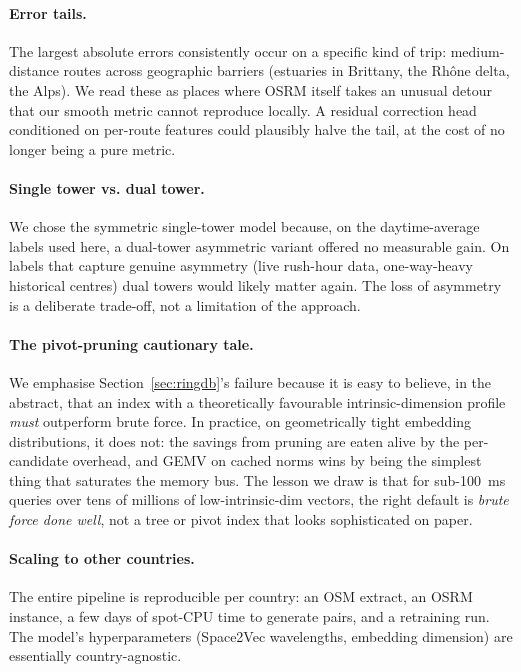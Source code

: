 \documentclass[11pt,a4paper]{article}
\begin{document}
\paragraph{Error tails.}
The largest absolute errors consistently occur on a specific kind of
trip: medium-distance routes across geographic barriers (estuaries
in Brittany, the Rh\^one delta, the Alps). We read these as places
where OSRM itself takes an unusual detour that our smooth metric
cannot reproduce locally. A residual correction head conditioned on
per-route features could plausibly halve the tail, at the cost of
no longer being a pure metric.

\paragraph{Single tower vs. dual tower.}
We chose the symmetric single-tower model because, on the
daytime-average labels used here, a dual-tower asymmetric variant
offered no measurable gain. On labels that capture genuine asymmetry
(live rush-hour data, one-way-heavy historical centres) dual towers
would likely matter again. The loss of asymmetry is a deliberate
trade-off, not a limitation of the approach.

\paragraph{The pivot-pruning cautionary tale.}
We emphasise Section~\ref{sec:ringdb}'s failure because it is easy
to believe, in the abstract, that an index with a theoretically
favourable intrinsic-dimension profile \emph{must} outperform brute
force. In practice, on geometrically tight embedding distributions,
it does not: the savings from pruning are eaten alive by the
per-candidate overhead, and GEMV on cached norms wins by being the
simplest thing that saturates the memory bus. The lesson we draw is
that for sub-100~ms queries over tens of millions of
low-intrinsic-dim vectors, the right default is \emph{brute force
done well}, not a tree or pivot index that looks sophisticated on
paper.

\paragraph{Scaling to other countries.}
The entire pipeline is reproducible per country: an OSM extract, an
OSRM instance, a few days of spot-CPU time to generate pairs, and a
retraining run. The model's hyperparameters (Space2Vec wavelengths,
embedding dimension) are essentially country-agnostic.
\end{document}
